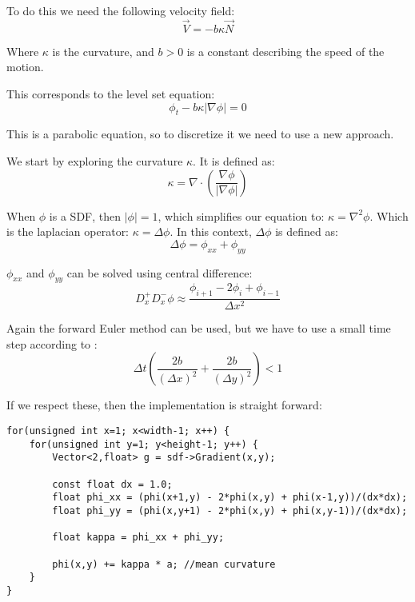 To do this we need the following velocity field:
\begin{equation}
  \vec{V} = -b\kappa\vec{N}
\end{equation}

Where $\kappa$ is the curvature, and $b>0$ is a constant describing the
speed of the motion. 

This corresponds to the level set equation: 
\begin{equation}
  \phi_t -b\kappa|\nabla\phi| = 0
\end{equation}

This is a parabolic equation, so to discretize it we need to use a new
approach. 

We start by exploring the curvature $\kappa$. It is defined as:
\begin{equation}
  \kappa = \nabla\cdot\left(\frac{\nabla\phi}{|\nabla\phi|}\right)
\end{equation}

When $\phi$ is a SDF, then $|\phi|=1$, which simplifies our equation
to: $\kappa = \nabla^2\phi$. Which is the laplacian operator: $\kappa =
\Delta\phi$. In this context, $\Delta\phi$ is defined as:
\begin{equation}
  \Delta\phi = \phi_{xx} + \phi_{yy}
\end{equation}

$\phi_{xx}$ and $\phi_{yy}$ can be solved using central difference:
\begin{equation}
  D^+_xD^-_x\phi 
  \approx
  \frac{\phi_{i+1}-2\phi_i+\phi_{i-1}}{\Delta x^2}
\end{equation} %

Again the forward Euler method can be used, but we have to use a small
time step according to :
\begin{equation}
   \Delta t \left(
     \frac{2b}{(\Delta x)^2} +
     \frac{2b}{(\Delta y)^2}
   \right) < 1
\end{equation}

If we respect these, then the  implementation is straight forward:


\begin{lstlisting}
for(unsigned int x=1; x<width-1; x++) {
    for(unsigned int y=1; y<height-1; y++) {
        Vector<2,float> g = sdf->Gradient(x,y);

        const float dx = 1.0;
        float phi_xx = (phi(x+1,y) - 2*phi(x,y) + phi(x-1,y))/(dx*dx);
        float phi_yy = (phi(x,y+1) - 2*phi(x,y) + phi(x,y-1))/(dx*dx);

        float kappa = phi_xx + phi_yy;
 
        phi(x,y) += kappa * a; //mean curvature
    }
}
\end{lstlisting}

